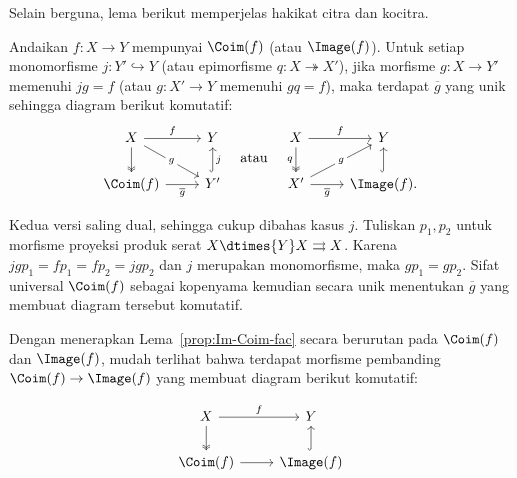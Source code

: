 Selain berguna, lema berikut memperjelas hakikat citra dan kocitra.

\begin{lema}\label{prop:Im-Coim-fac}
	Andaikan $f: X \to Y$ mempunyai $\Coim(f)$ (atau $\Image(f)$). Untuk setiap
	monomorfisme $j: Y' \hookrightarrow Y$ (atau epimorfisme
	$q: X \twoheadrightarrow X'$), jika morfisme $g: X \to Y'$ memenuhi
	$j g = f$ (atau $g: X' \to Y$ memenuhi $gq = f$), maka terdapat
	$\overline{g}$ yang unik sehingga diagram berikut komutatif:
	\[\begin{tikzcd}
		X \arrow[r, "f"] \arrow[twoheadrightarrow, d] \arrow[rd, "g" description] & Y \\
		\Coim(f) \arrow[r, "\overline{g}"'] & Y' \arrow[hookrightarrow, u, "j"']
	\end{tikzcd} \quad \text{atau} \quad \begin{tikzcd}
		X \arrow[r, "f"] \arrow[twoheadrightarrow, d, "q"'] & Y \\
		X' \arrow[r, "\overline{g}"'] \arrow[ru, "g" description] & \Image(f) \arrow[hookrightarrow, u] .
	\end{tikzcd}\]
\end{lema}

\begin{bukti}
	Kedua versi saling dual, sehingga cukup dibahas kasus $j$. Tuliskan
	$p_1, p_2$ untuk morfisme proyeksi produk serat
	$X \dtimes{Y} X \rightrightarrows X$. Karena
	$j g p_1 = f p_1 = f p_2 = j g p_2$ dan $j$ merupakan monomorfisme, maka
	$g p_1 = g p_2$. Sifat universal $\Coim(f)$ sebagai kopenyama kemudian
	secara unik menentukan $\overline{g}$ yang membuat diagram tersebut
	komutatif.
\end{bukti}

Dengan menerapkan Lema~\ref{prop:Im-Coim-fac} secara berurutan pada
$\Coim(f)$ dan $\Image(f)$, mudah terlihat bahwa terdapat morfisme pembanding
$\Coim(f) \to \Image(f)$ yang membuat diagram berikut komutatif:

\begin{equation}\label{eqn:strict-morphism} \begin{tikzcd}
	X \arrow[r, "f"] \arrow[twoheadrightarrow, d] & Y \\
	\Coim(f) \arrow[r] & \Image(f) \arrow[hookrightarrow, u]
\end{tikzcd}\end{equation}

